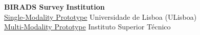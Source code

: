 \documentclass[12pt,twoside,a4paper]{article}
\begin{document}
\noindent
\large
\textbf{BIRADS Survey} \hfill \textbf{Institution} \\
\normalsize
\hyperlink{https://github.com/MIMBCD-UI/prototype-single-modality}{Single-Modality Prototype} \hfill Universidade de Lisboa (ULisboa) \\
\hyperlink{https://github.com/MIMBCD-UI/prototype-multi-modality}{Multi-Modality Prototype} \hfill Instituto Superior T\'{e}cnico \\




\clearpage


\end{document}
